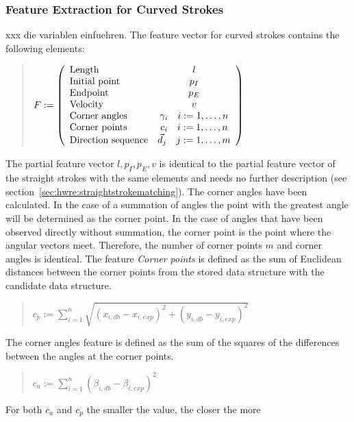 \subsubsection{Feature Extraction for Curved Strokes}
\label{sec:hwre:featureextractionforcurvedstrokes}
xxx die variablen einfuehren.
The feature vector for curved strokes contains the following elements:
\begin{quote}
\(
    F :=
    \left( 
    \begin {array} {l c} 
        \text{Length} & l \\
        \text{Initial point} & p_{I} \\
        \text{Endpoint} & p_{E} \\
        \text{Velocity} & v \\
        \text{Corner angles} & \gamma_{i} \quad i := 1, \ldots , n \\
        \text{Corner points} & c_{i} \quad i := 1, \ldots , n \\
        \text{Direction sequence} & \vec{d}_j \quad j := 1, \ldots , m \\
    \end {array} 
    \right)
\)
\end{quote}
The partial feature vector \( l, p_{I}, p_{E}, v\) is identical to the partial
feature vector of the straight strokes with the same elements and needs no
further description (see section~\ref{sec:hwre:straightstrokematching}).
The corner angles have been calculated. In the case of a summation
of angles the point with the greatest angle will be determined as the 
corner point. In the case of angles that have been observed directly without 
summation, the corner point is the point where the angular vectors meet.
Therefore, the number of corner points \( m \) and corner angles is identical.
The feature \emph{Corner points} is defined as the sum of Euclidean distances 
between the corner points from the stored data structure with the candidate 
data structure.
\begin{quote}
\(
  c_p := \sum\limits_{i=1}^{n} \sqrt{(x_{i,db}-x_{i,exp})^2+(y_{i,db}-y_{i,exp})^2} %
\)
\end{quote}
The corner angles feature is defined as the sum of the squares of the 
differences between the angles at the corner points.
\begin{quote}
\(
  c_a := \sum\limits_{i=1}^{n} (\beta_{i,db}-\beta_{i,exp})^2
\)
\end{quote}
For both \( c_a \) and \( c_p \) the smaller the value, the closer the more
